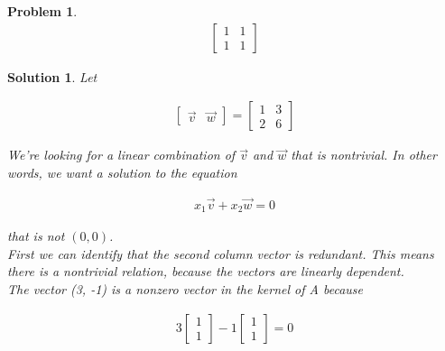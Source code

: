 \documentclass{article}
\newtheorem{problem}{Problem}
\newtheorem*{solution}{Solution}
\begin{document}
\begin{problem}
\begin{align*}
\begin{bmatrix}1 & 1 \\ 1 & 1 \end{bmatrix}
\end{align*}
\end{problem}

\begin{solution}
Let

\begin{align*}
\begin{bmatrix}\vec{v} & \vec{w} \end{bmatrix} = \begin{bmatrix}1 & 3 \\ 2 & 6 \end{bmatrix}
\end{align*}

We're looking for a linear combination of $\vec{v}$ and $\vec{w}$ that is nontrivial. In other words, we want a solution to the equation

\begin{align*}
x_{1} \vec{v} + x_{2} \vec{w} = 0
\end{align*}

that is not $(0, 0)$. \\

First we can identify that the second column vector is redundant. This means there is a nontrivial relation, because the vectors are linearly dependent. \\

The vector (3, -1) is a nonzero vector in the kernel of A because 

\begin{align*}
3 \begin{bmatrix} 1 \\ 1 \end{bmatrix} - 1\begin{bmatrix} 1 \\ 1\end{bmatrix} = 0
\end{align*}

\end{solution}
\end{document}
